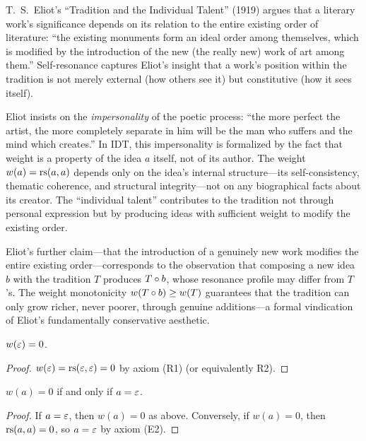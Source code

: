 \begin{interpretation}\label{interp:ch3:eliot_tradition}
T.~S.~Eliot's ``Tradition and the Individual Talent'' (1919) argues that
a literary work's significance depends on its relation to the entire
existing order of literature: ``the existing monuments form an ideal order
among themselves, which is modified by the introduction of the new (the
really new) work of art among them.'' Self-resonance captures Eliot's
insight that a work's position within the tradition is not merely
external (how others see it) but constitutive (how it sees itself).

Eliot insists on the \emph{impersonality} of the poetic process: ``the
more perfect the artist, the more completely separate in him will be the
man who suffers and the mind which creates.'' In IDT, this impersonality
is formalized by the fact that weight is a property of the idea $a$
itself, not of its author. The weight $w(a) = \mathrm{rs}(a, a)$ depends only on
the idea's internal structure---its self-consistency, thematic coherence,
and structural integrity---not on any biographical facts about its creator.
The ``individual talent'' contributes to the tradition not through personal
expression but by producing ideas with sufficient weight to modify the
existing order.

Eliot's further claim---that the introduction of a genuinely new work
modifies the entire existing order---corresponds to the observation that
composing a new idea $b$ with the tradition $T$ produces $T \circ b$,
whose resonance profile may differ from $T$'s. The weight monotonicity
$w(T \circ b) \geq w(T)$ guarantees that the tradition can only grow
richer, never poorer, through genuine additions---a formal vindication
of Eliot's fundamentally conservative aesthetic.
\end{interpretation}

\begin{proposition}
$w(\varepsilon) = 0$.
\end{proposition}
\begin{proof}
$w(\varepsilon) = \mathrm{rs}(\varepsilon, \varepsilon) = 0$ by axiom (R1) (or equivalently R2).
\end{proof}

\begin{proposition}
$w(a) = 0$ if and only if $a = \varepsilon$.
\end{proposition}
\begin{proof}
If $a = \varepsilon$, then $w(a) = 0$ as above. Conversely, if $w(a) = 0$, then
$\mathrm{rs}(a,a) = 0$, so $a = \varepsilon$ by axiom (E2).
\end{proof}

